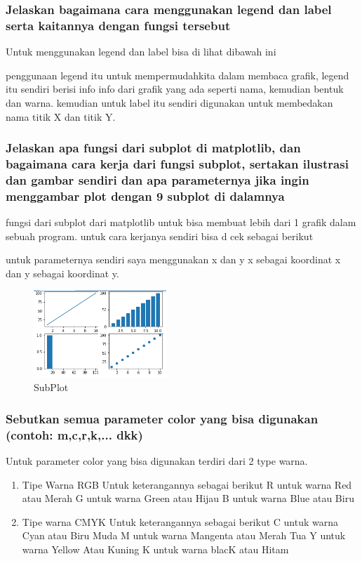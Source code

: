 \subsubsection{Jelaskan bagaimana cara menggunakan legend dan label serta kaitannya dengan fungsi tersebut}
\hfill \break
Untuk menggunakan legend dan label bisa di lihat dibawah ini

penggunaan legend itu untuk mempermudahkita dalam membaca grafik, legend itu sendiri berisi info info dari grafik yang ada seperti nama, kemudian bentuk dan warna.
kemudian untuk label itu sendiri digunakan untuk membedakan nama titik X dan titik Y.
\subsubsection{Jelaskan apa fungsi dari subplot di matplotlib, dan bagaimana cara kerja dari fungsi subplot, sertakan ilustrasi dan gambar sendiri dan apa parameternya jika ingin menggambar plot dengan 9 subplot di dalamnya}
\hfill \break
fungsi dari subplot dari matplotlib untuk bisa membuat lebih dari 1 grafik dalam sebuah program.
untuk cara kerjanya sendiri bisa d cek sebagai berikut

untuk parameternya sendiri saya menggunakan x dan y x sebagai koordinat x dan y sebagai koordinat y.
\begin{figure}[H]	
    \includegraphics[width=5cm]{figures/6/1174070/teori/chart.png}
    \centering
    \caption{SubPlot}
\end{figure}
\subsubsection{Sebutkan semua parameter color yang bisa digunakan (contoh: m,c,r,k,... dkk)}
\hfill \break
Untuk parameter color yang bisa digunakan terdiri dari 2 type warna.
\begin{enumerate}
    \item Tipe Warna RGB
    Untuk keterangannya sebagai berikut
    R untuk warna Red atau Merah
    G untuk warna Green atau Hijau
    B untuk warna Blue atau Biru
    \item Tipe warna CMYK
    Untuk keterangannya sebagai berikut
    C untuk warna Cyan atau Biru Muda
    M untuk warna Mangenta atau Merah Tua
    Y untuk warna Yellow Atau Kuning
    K untuk warna blacK atau Hitam
\end{enumerate}

